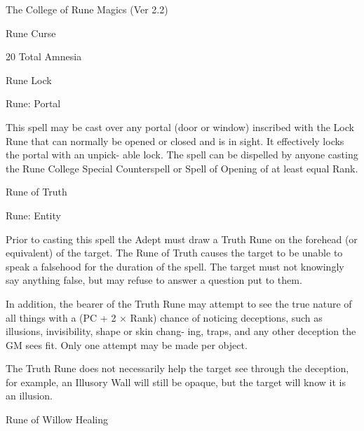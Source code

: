 \begin{Chapter}{The College of Rune Magics (Ver 2.2)}
\begin{spell}[S-6]{Rune Curse }
\begin{effects}
20 Total Amnesia 

\end{effects}
\end{spell}

\begin{spell}[S-7]{Rune Lock }

Rune: Portal 
\begin{effects}
 This  spell  may  be  cast  over  any  portal 
(door  or  window)  inscribed  with  the  Lock  Rune 
that  can  normally  be  opened  or  closed  and  is  in 
sight. It effectively locks the portal with an unpick-
able  lock.  The  spell  can  be  dispelled  by  anyone 
casting  the  Rune  College  Special  Counterspell  or 
Spell of Opening of at least equal Rank. 

\end{effects}
\end{spell}

\begin{spell}[S-8]{Rune of Truth }

Rune: Entity 
\begin{effects}
 Prior  to  casting  this  spell  the  Adept  must 
draw a Truth Rune on the forehead (or equivalent) 
of  the  target.  The  Rune  of  Truth  causes  the  target 
to  be  unable  to  speak  a  falsehood  for  the  duration 
of  the  spell.  The  target  must  not  knowingly  say 
anything false, but may refuse to answer a question 
put to them. 

In  addition,  the  bearer  of  the  Truth  Rune  may 
attempt  to  see  the  true  nature  of  all  things  with  a 
(PC  +  2  ×  Rank)  chance  of  noticing  deceptions, 
such as illusions, invisibility, shape or skin chang-
ing, traps, and any other deception the GM sees fit. 
Only one attempt may be made per object. 

The Truth Rune does not necessarily help the target 
see through the deception, for example, an Illusory 
Wall  will still be opaque, but  the target  will know 
it is an illusion. 

\end{effects}
\end{spell}

\begin{spell}[S-9]{Rune of Willow Healing }


\end{spell}
\end{Chapter}
